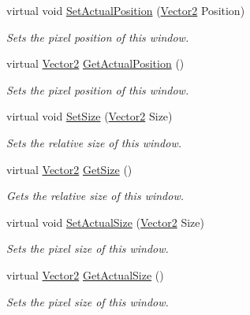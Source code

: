 \begin{DoxyCompactItemize}
virtual void \hyperlink{classphys_1_1UI_1_1Window_aeedbf986dca9556fd62980a6d7d27c79}{SetActualPosition} (\hyperlink{classphys_1_1Vector2}{Vector2} Position)
\begin{DoxyCompactList}\small\item\em Sets the pixel position of this window. \item\end{DoxyCompactList}\item 
virtual \hyperlink{classphys_1_1Vector2}{Vector2} \hyperlink{classphys_1_1UI_1_1Window_a811fb495bc698752e03778b18f2b1a30}{GetActualPosition} ()
\begin{DoxyCompactList}\small\item\em Sets the pixel position of this window. \item\end{DoxyCompactList}\item 
virtual void \hyperlink{classphys_1_1UI_1_1Window_adbd4d4c908c3d3458139e87bf16006bf}{SetSize} (\hyperlink{classphys_1_1Vector2}{Vector2} Size)
\begin{DoxyCompactList}\small\item\em Sets the relative size of this window. \item\end{DoxyCompactList}\item 
virtual \hyperlink{classphys_1_1Vector2}{Vector2} \hyperlink{classphys_1_1UI_1_1Window_a9946100eb6e6e985921bbea9e87cede3}{GetSize} ()
\begin{DoxyCompactList}\small\item\em Gets the relative size of this window. \item\end{DoxyCompactList}\item 
virtual void \hyperlink{classphys_1_1UI_1_1Window_ad297fc3485097a2bce7120f9f22d6c19}{SetActualSize} (\hyperlink{classphys_1_1Vector2}{Vector2} Size)
\begin{DoxyCompactList}\small\item\em Sets the pixel size of this window. \item\end{DoxyCompactList}\item 
virtual \hyperlink{classphys_1_1Vector2}{Vector2} \hyperlink{classphys_1_1UI_1_1Window_a22f5ca800e44c5e2cfeed59c243b03ed}{GetActualSize} ()
\begin{DoxyCompactList}\small\item\em Sets the pixel size of this window. \item\end{DoxyCompactList}\item 

\end{DoxyCompactItemize}

